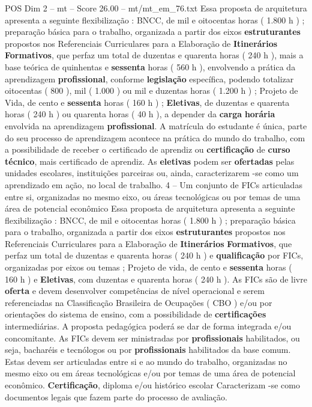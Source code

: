 \begin{textsample}{POS Dim 2 – mt – Score 26.00 – mt/mt\_em\_76.txt}
Essa proposta de arquitetura apresenta a seguinte flexibilização : BNCC, de mil e oitocentas horas ( 1.800 h ) ; preparação básica para o trabalho, organizada a partir dos eixos \textbf{estruturantes} propostos nos Referenciais Curriculares para a Elaboração de \textbf{Itinerários} \textbf{Formativos}, que perfaz um total de duzentas e quarenta horas ( 240 h ), mais a base teórica de quinhentas e \textbf{sessenta} horas ( 560 h ), envolvendo a prática da aprendizagem \textbf{profissional}, conforme \textbf{legislação} específica, podendo totalizar oitocentas ( 800 ), mil ( 1.000 ) ou mil e duzentas horas ( 1.200 h ) ; Projeto de Vida, de cento e \textbf{sessenta} horas ( 160 h ) ; \textbf{Eletivas}, de duzentas e quarenta horas ( 240 h ) ou quarenta horas ( 40 h ), a depender da \textbf{carga} \textbf{horária} envolvida na aprendizagem \textbf{profissional}.
A matrícula do estudante é única, parte do seu processo de aprendizagem acontece na prática do mundo do trabalho, com a possibilidade de receber o certificado de aprendiz ou \textbf{certificação} de \textbf{curso} \textbf{técnico}, mais certificado de aprendiz.
As \textbf{eletivas} podem ser \textbf{ofertadas} pelas unidades escolares, instituições parceiras ou, ainda, caracterizarem -se como um aprendizado em ação, no local de trabalho. 4 – Um conjunto de FICs articuladas entre si, organizadas no mesmo eixo, ou áreas tecnológicas ou por temas de uma área de potencial econômico Essa proposta de arquitetura apresenta a seguinte flexibilização : BNCC, de mil e oitocentas horas ( 1.800 h ) ; preparação básica para o trabalho, organizada a partir dos eixos \textbf{estruturantes} propostos nos Referenciais Curriculares para a Elaboração de \textbf{Itinerários} \textbf{Formativos}, que perfaz um total de duzentas e quarenta horas ( 240 h ) e \textbf{qualificação} por FICs, organizadas por eixos ou temas ; Projeto de vida, de cento e \textbf{sessenta} horas ( 160 h ) e \textbf{Eletivas}, com duzentas e quarenta horas ( 240 h ).
As FICs são de livre \textbf{oferta} e devem desenvolver competências de nível operacional e serem referenciadas na Classificação Brasileira de Ocupações ( CBO ) e/ou por orientações do sistema de ensino, com a possibilidade de \textbf{certificações} intermediárias.
A proposta pedagógica poderá se dar de forma integrada e/ou concomitante.
As FICs devem ser ministradas por \textbf{profissionais} habilitados, ou seja, bacharéis e tecnólogos ou por \textbf{profissionais} habilitados da base comum.
Estas devem ser articuladas entre si e ao mundo do trabalho, organizadas no mesmo eixo ou em áreas tecnológicas e/ou por temas de uma área de potencial econômico. \textbf{Certificação}, diploma e/ou histórico escolar Caracterizam -se como documentos legais que fazem parte do processo de avaliação.

\end{textsample}
